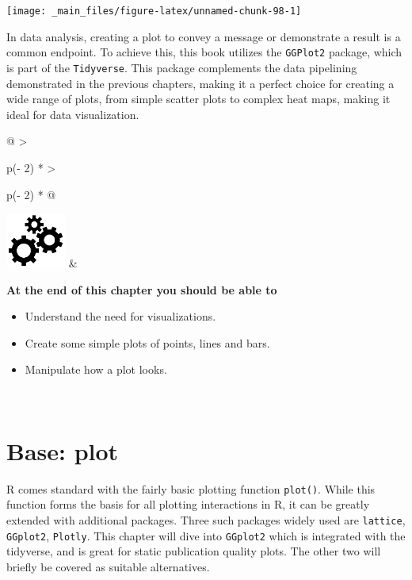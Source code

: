 \documentclass[
]{book}
\begin{document}
\begin{center}\texttt{[image: \_main\_files/figure-latex/unnamed-chunk-98-1]} \end{center}

In data analysis, creating a plot to convey a message or demonstrate a result is a common endpoint. To achieve this, this book utilizes the \texttt{GGPlot2} package, which is part of the \texttt{Tidyverse}. This package complements the data pipelining demonstrated in the previous chapters, making it a perfect choice for creating a wide range of plots, from simple scatter plots to complex heat maps, making it ideal for data visualization.

\hfill\break

\begin{longtable}[]{@{}
  >{\raggedright\arraybackslash}p{(\columnwidth - 2\tabcolsep) * }
  >{\raggedright\arraybackslash}p{(\columnwidth - 2\tabcolsep) * }@{}}
\toprule\noalign{}
\endhead
\bottomrule\noalign{}
\endlastfoot
\includegraphics[width=\textwidth,height=0.70833in]{images/03.png} & \begin{minipage}[t]{\linewidth}\raggedright
\textbf{At the end of this chapter you should be able to}

\begin{itemize}
\item
  Understand the need for visualizations.
\item
  Create some simple plots of points, lines and bars.
\item
  Manipulate how a plot looks.
\end{itemize}
\end{minipage} \\
\end{longtable}

\hfill\break

\hypertarget{base-plot}{%
\section{Base: plot}\label{base-plot}}

R comes standard with the fairly basic plotting function \texttt{plot()}. While this function forms the basis for all plotting interactions in R, it can be greatly extended with additional packages. Three such packages widely used are \texttt{lattice}, \texttt{GGplot2}, \texttt{Plotly}. This chapter will dive into \texttt{GGplot2} which is integrated with the tidyverse, and is great for static publication quality plots. The other two will briefly be covered as suitable alternatives.
\end{document}

